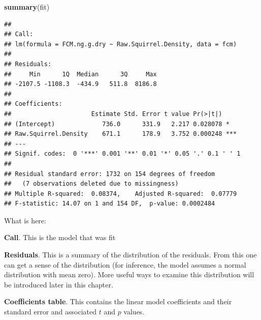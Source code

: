 \documentclass[]{book}
\newenvironment{Shaded}{\begin{snugshade}}{\end{snugshade}}
\newcommand{\KeywordTok}[1]{\textcolor[rgb]{0.13,0.29,0.53}{\textbf{#1}}}
\newcommand{\NormalTok}[1]{#1}
\begin{document}
\begin{Shaded}
\begin{Highlighting}[]
\KeywordTok{summary}\NormalTok{(fit)}
\end{Highlighting}
\end{Shaded}

\begin{verbatim}
## 
## Call:
## lm(formula = FCM.ng.g.dry ~ Raw.Squirrel.Density, data = fcm)
## 
## Residuals:
##     Min      1Q  Median      3Q     Max 
## -2107.5 -1108.3  -434.9   511.8  8186.8 
## 
## Coefficients:
##                      Estimate Std. Error t value Pr(>|t|)    
## (Intercept)             736.0      331.9   2.217 0.028078 *  
## Raw.Squirrel.Density    671.1      178.9   3.752 0.000248 ***
## ---
## Signif. codes:  0 '***' 0.001 '**' 0.01 '*' 0.05 '.' 0.1 ' ' 1
## 
## Residual standard error: 1732 on 154 degrees of freedom
##   (7 observations deleted due to missingness)
## Multiple R-squared:  0.08374,    Adjusted R-squared:  0.07779 
## F-statistic: 14.07 on 1 and 154 DF,  p-value: 0.0002484
\end{verbatim}

What is here:

\textbf{Call}. This is the model that was fit

\textbf{Residuals}. This is a summary of the distribution of the
residuals. From this one can get a sense of the distribution (for
inference, the model assumes a normal distribution with mean zero). More
useful ways to examine this distribution will be introduced later in
this chapter.

\textbf{Coefficients table}. This contains the linear model coefficients
and their standard error and associated \(t\) and \(p\) values.
\end{document}
